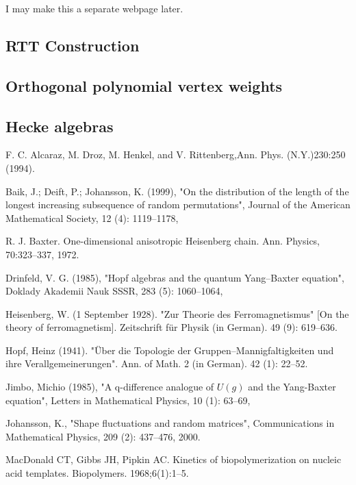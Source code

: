\documentclass{ximera}
\begin{document}
I may make this a separate webpage later.

\subsection{RTT Construction}



\subsection{Orthogonal polynomial vertex weights}

\subsection{Hecke algebras}

\begin{thebibliography}{10}

 F. C. Alcaraz, M. Droz, M. Henkel, 
and V. Rittenberg,Ann. Phys. (N.Y.)230:250 (1994).

 Baik, J.; Deift, P.; Johansson, K. (1999), "On the distribution of the length of the longest increasing subsequence of random permutations", 
Journal of the American Mathematical Society, 12 (4): 1119--1178,

 R. J. Baxter. One-dimensional anisotropic Heisenberg chain. 
Ann. Physics, 70:323--337, 1972.

 Drinfeld, V. G. (1985), "Hopf algebras and the quantum Yang–Baxter equation", 
Doklady Akademii Nauk SSSR, 283 (5): 1060--1064, 

 Heisenberg, W. (1 September 1928). "Zur Theorie des Ferromagnetismus" [On the theory of ferromagnetism]. 
Zeitschrift für Physik (in German). 49 (9): 619--636.

 Hopf, Heinz (1941). "Über die Topologie der Gruppen--Mannigfaltigkeiten und ihre Verallgemeinerungen". 
Ann. of Math. 2 (in German). 42 (1): 22–52.

 Jimbo, Michio (1985), "A q-difference analogue of $U(g)$ and the Yang-Baxter equation", 
Letters in Mathematical Physics, 10 (1): 63--69, 

 Johansson, K., "Shape fluctuations and random matrices", 
Communications in Mathematical Physics, 209 (2): 437--476, 2000.

 MacDonald CT, Gibbs JH, Pipkin AC. Kinetics of biopolymerization on nucleic acid templates. 
Biopolymers. 1968;6(1):1--5.


\end{thebibliography}
\end{document}
